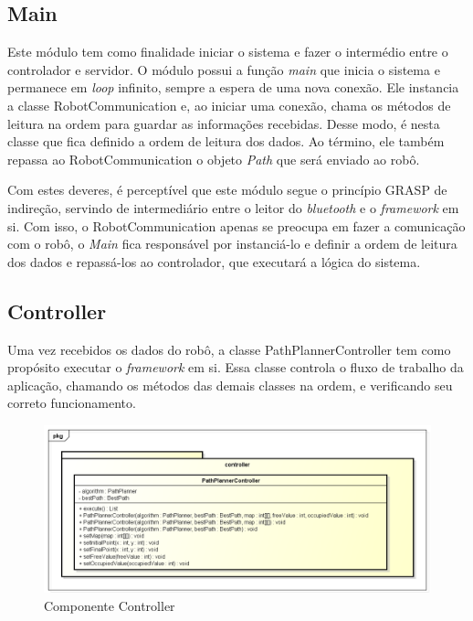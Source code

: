 \subsection{Main}

Este módulo tem como finalidade iniciar o sistema e fazer o intermédio entre o controlador e servidor. O módulo possui a função \textit{main} que inicia o sistema e permanece em  \textit{loop} infinito, sempre a espera de uma nova conexão. Ele instancia a classe RobotCommunication e, ao iniciar uma conexão, chama os métodos de leitura na ordem para guardar as informações recebidas. Desse modo, é nesta classe que fica definido a ordem de leitura dos dados. Ao término, ele também repassa ao RobotCommunication o objeto \textit{Path} que será enviado ao robô.

Com estes deveres, é perceptível que este módulo segue o princípio GRASP de indireção, servindo de intermediário entre o leitor do \textit{bluetooth} e o \textit{framework} em si. Com isso, o RobotCommunication apenas se preocupa em fazer a comunicação com o robô, o \textit{Main} fica responsável por instanciá-lo e definir a ordem de leitura dos dados e repassá-los ao controlador, que executará a lógica do sistema.

\subsection{Controller}

Uma vez recebidos os dados do robô, a classe PathPlannerController tem como propósito executar o \textit{framework} em si. Essa classe controla o fluxo de trabalho da aplicação, chamando os métodos das demais classes na ordem, e verificando seu correto funcionamento.

\begin{figure}[h]
	\centering
	\label{fig25}
		\includegraphics[keepaspectratio=true,scale=0.6]{figuras/pkgcontroller.png}
	\caption{Componente Controller}
\end{figure}

